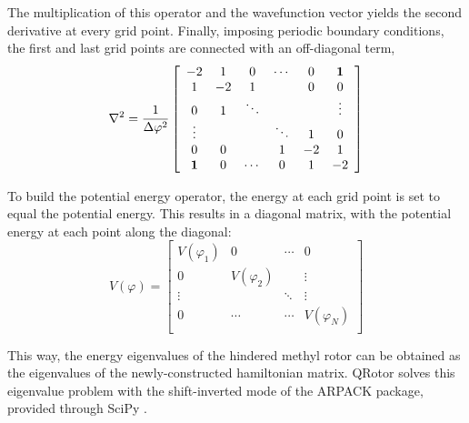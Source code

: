 \documentclass[12pt,a4paper]{article}
\begin{document}
The multiplication of this operator and the wavefunction vector yields the second derivative at every grid point.
Finally, imposing periodic boundary conditions, the first and last grid points are connected with an off-diagonal term,
\[
    \nabla^2 = \frac{1}{\Delta\varphi^2}
    \left[ {\begin{array}{cccccc}
    -2      &  1     &  0     & \cdots &  0    &  \bf{1} \\
     1      & -2     &  1     &        &  0    &  0      \\
     0      &  1     & \ddots &        &       &  \vdots \\
     \vdots &        &        & \ddots &  1    &  0      \\
     0      &  0     &        &  1     & -2    &  1      \\
     \bf{1} &  0     & \cdots &  0     &  1    & -2      \\
    \end{array} } \right]
\]

To build the potential energy operator, the energy at each grid point is set to equal the potential energy.
This results in a diagonal matrix, with the potential energy at each point along the diagonal:
\[
    V(\varphi) =
    \left[ {\begin{array}{cccc}
    V(\varphi_1) &  0            &  \cdots &  0          \\
     0           &  V(\varphi_2) &         &  \vdots     \\
     \vdots      &               &  \ddots &   \vdots     \\
     0           &   \cdots      &  \cdots & V(\varphi_N) \\
    \end{array} } \right]
\]

This way, the energy eigenvalues of the hindered methyl rotor can be obtained as the eigenvalues of the newly-constructed hamiltonian matrix. QRotor solves this eigenvalue problem with the shift-inverted mode of the ARPACK package, provided through SciPy \cite{arpack}.

\end{document}
